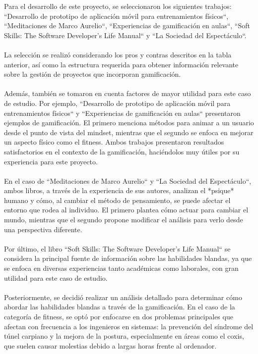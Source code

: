 Para el desarrollo de este proyecto, se seleccionaron los siguientes trabajos:  
``Desarrollo de prototipo de aplicación móvil para entrenamientos físicos``,  
``Meditaciones de Marco Aurelio``,  
``Experiencias de gamificación en aulas``,  
``Soft Skills: The Software Developer's Life Manual`` y  
``La Sociedad del Espectáculo``.  
\\ \\
La selección se realizó considerando los pros y contras descritos en la tabla anterior, así como la estructura requerida para obtener información relevante sobre la gestión de proyectos que incorporan gamificación.
\\ \\
Además, también se tomaron en cuenta factores de mayor utilidad para este caso de estudio. Por ejemplo,  
``Desarrollo de prototipo de aplicación móvil para entrenamientos físicos`` y  
``Experiencias de gamificación en aulas`` presentaron ejemplos de gamificación.  
El primero menciona métodos para animar a un usuario desde el punto de vista del mindset, mientras que el segundo se enfoca en mejorar un aspecto físico como el fitness. Ambos trabajos presentaron resultados satisfactorios en el contexto de la gamificación, haciéndolos muy útiles por su experiencia para este proyecto.
\\ \\
En el caso de  
``Meditaciones de Marco Aurelio`` y  
``La Sociedad del Espectáculo``,  
ambos libros, a través de la experiencia de sus autores, analizan el *psique* humano y cómo, al cambiar el método de pensamiento, se puede afectar el entorno que rodea al individuo.  
El primero plantea cómo actuar para cambiar el mundo, mientras que el segundo propone modificar el análisis para verlo desde una perspectiva diferente.
\\ \\
Por último, el libro ``Soft Skills: The Software Developer’s Life Manual`` se considera la principal fuente de información sobre las habilidades blandas, ya que se enfoca en diversas experiencias tanto académicas como laborales, con gran utilidad para este caso de estudio.
\\ \\
Posteriormente, se decidió realizar un análisis detallado para determinar cómo abordar las habilidades blandas a través de la gamificación. En el caso de la categoría de fitness, se optó por enfocarse en dos problemas principales que afectan con frecuencia a los ingenieros en sistemas: la prevención del síndrome del túnel carpiano y la mejora de la postura, especialmente en áreas como el coxis, que suelen causar molestias debido a largas horas frente al ordenador.
